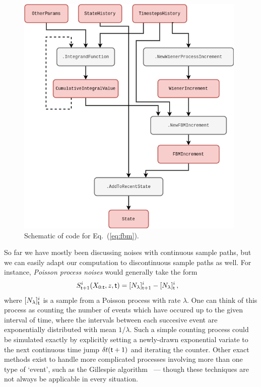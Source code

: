 \begin{figure}[h]
\centering
\includegraphics[width=11cm]{images/chapter-1-fractional-brownian-motion.drawio.png}
\caption{Schematic of code for Eq.~(\ref{eq:fbm}).}
\label{fig:fractional-brownian-motion}
\end{figure}

So far we have mostly been discussing noises with continuous sample paths, but we can easily adapt our computation to discontinuous sample paths as well. For instance, \emph{Poisson process noises} would generally take the form
\begin{align}
S^{i}_{{\sf t}+1}(X_{0:{\sf t}},z,{\sf t}) &= [N_{\lambda}]^i_{{\sf t}+1}-[N_{\lambda}]^i_{\sf t}\,,
\end{align}
where $[N_{\lambda}]^i_{\sf t}$ is a sample from a Poisson process with rate $\lambda$. One can think of this process as counting the number of events which have occured up to the given interval of time, where the intervals between each succesive event are exponentially distributed with mean $1/\lambda$. Such a simple counting process could be simulated exactly by explicitly setting a newly-drawn exponential variate to the next continuous time jump ${\delta t}({\sf t}+1)$ and iterating the counter. Other exact methods exist to handle more complicated processes involving more than one type of `event', such as the Gillespie algorithm~\cite{gillespie1977exact} --- though these techniques are not always be applicable in every situation.


